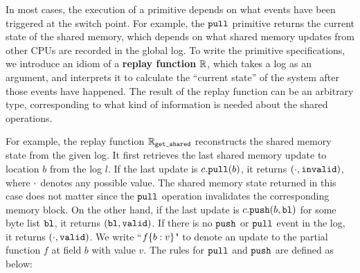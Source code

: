 In most cases, the execution of a primitive depends on what events have
been triggered at the switch point. 
For example, the ${\texttt{pull}}$ primitive returns the
current state of the shared memory, which depends on what shared
memory updates from other CPUs are recorded in the global log.
To write the primitive specifications, we introduce an idiom of a
\textbf{replay function} $\mathbb{R}$, which takes a
log as an argument, and interprets it to calculate the ``current
state'' of the system after those events have happened. The
result of the replay function can be an arbitrary type, corresponding
to what kind of information is needed about the shared operations.

For example, the replay function $\mathbb{R}_{{\texttt{get\_shared}}}$
reconstructs the shared memory state from the given log.
It first retrieves the last shared memory
update to location $b$ from the log $l$. If the last update is
$c.{\texttt{pull}}(b)$, it returns $(\cdot, {\texttt{invalid}})$, where $\cdot$ denotes
any possible value. The shared memory state returned in this case
does not matter since the ${\texttt{pull}}$ operation invalidates the corresponding
memory block. On the other hand, if the last update
is $c.{\texttt{push}}(b,{\texttt{bl}})$ for some byte list ${\texttt{bl}}$,
it returns $({\texttt{bl}}, {\texttt{valid}})$. 
If there is no ${\texttt{push}}$ or ${\texttt{pull}}$ event in the log, it returns
$(\cdot, {\texttt{valid}})$. We write ``$f\{b:v\}$"
to denote an update to the partial function $f$ at field $b$ 
with value $v$.
The rules for ${\texttt{pull}}$ and ${\texttt{push}}$ are defined as below:
\begin{small}
\vspace{-5pt}
\end{small}%

